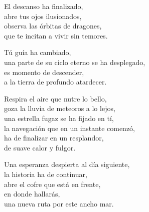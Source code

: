 \begin{center}
\vspace{3em}
El descanso ha finalizado,\\
abre tus ojos ilusionados,\\
observa las órbitas de dragones,\\
que te incitan a vivir sin temores.

\vspace{1em}
Tú guía ha cambiado,\\
una parte de su ciclo eterno se ha desplegado,\\
es momento de descender,\\
a la tierra de profundo atardecer.

\vspace{1em}
Respira el aire que nutre lo bello,\\
goza la lluvia de meteoros a lo lejos,\\
una estrella fugaz se ha fijado en tí,\\
la navegación que en un instante comenzó,\\
ha de finalizar en un resplandor,\\
de suave calor y fulgor.

\vspace{1em}
Una esperanza despierta al día siguiente,\\
la historia ha de continuar,\\
abre el cofre que está en frente,\\
en donde hallarás,\\
una nueva ruta por este ancho mar.


\end{center}




